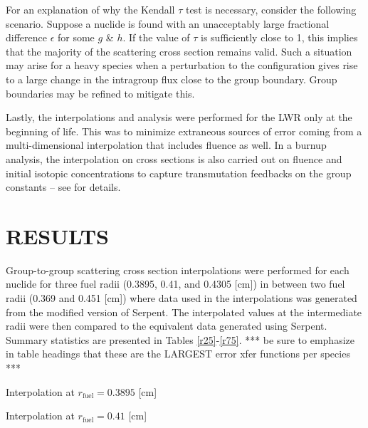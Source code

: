\documentclass{physor2012}
\begin{document}
For an explanation of why the Kendall $\tau$ test is necessary, consider the following
scenario.  Suppose a nuclide is found with an unacceptably large fractional
difference $\epsilon$ for some $g$ \& $h$.  If the value of $\tau$ is sufficiently
close to 1, this implies that the majority of the scattering cross section
remains valid.  Such a situation may arise for a heavy species when a perturbation to the configuration gives rise to a large change in the intragroup flux close to the group boundary.  Group boundaries may be refined to mitigate this.

Lastly, the interpolations and analysis were performed for the LWR only
at the beginning of life.  This was to minimize extraneous sources of error
coming from a multi-dimensional interpolation that includes fluence as well.  In a burnup analysis, the interpolation on cross sections is also carried out on fluence and initial isotopic concentrations to capture transmutation feedbacks on the group constants -- see \cite{} for details.

\section{RESULTS}
\label{sec:results}

Group-to-group scattering cross section interpolations were performed for
each nuclide for three fuel radii (0.3895, 0.41, and 0.4305 [cm]) in between two
fuel radii (0.369 and 0.451 [cm]) where data used in the interpolations was generated from the modified version of Serpent.  The interpolated values at the intermediate radii were then compared to the equivalent data
generated using Serpent.  Summary statistics are presented in
Tables \ref{r25}-\ref{r75}.
*** be sure to emphasize in table headings that these are the LARGEST error xfer functions per species ***
\begin{table}[htbp]
\begin{center}
\caption{Interpolation at $r_{\mbox{fuel}}=0.3895$ [cm]}
\label{r25}

\end{center}
\end{table}

\begin{table}[htbp]
\begin{center}
\caption{Interpolation at $r_{\mbox{fuel}}=0.41$ [cm]}
\label{r50}

\end{center}
\end{table}
\end{document}
